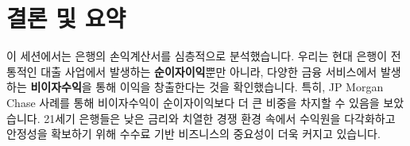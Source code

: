 \documentclass[11pt,a4paper]{article}
\theoremstyle{definition}
\begin{document}
\newpage
\section{결론 및 요약}

\begin{summarybox}[title={핵심 정리}]
이 세션에서는 은행의 손익계산서를 심층적으로 분석했습니다. 우리는 현대 은행이 전통적인 대출 사업에서 발생하는 \textbf{순이자이익}뿐만 아니라, 다양한 금융 서비스에서 발생하는 \textbf{비이자수익}을 통해 이익을 창출한다는 것을 확인했습니다. 특히, JP Morgan Chase 사례를 통해 비이자수익이 순이자이익보다 더 큰 비중을 차지할 수 있음을 보았습니다. 21세기 은행들은 낮은 금리와 치열한 경쟁 환경 속에서 수익원을 다각화하고 안정성을 확보하기 위해 수수료 기반 비즈니스의 중요성이 더욱 커지고 있습니다.
\end{summarybox}
\end{document}
